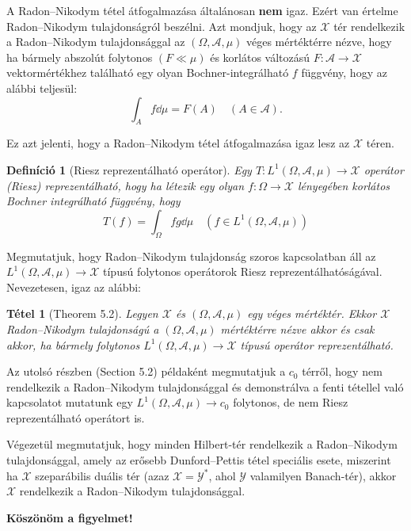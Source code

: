 \documentclass[handout]{beamer} %
\newtheorem{theo}[lem]{Tétel}
\newtheorem{defi}[lem]{Definíció}
\begin{document}
\begin{frame}
\justifying
A Radon\---Nikodym tétel átfogalmazása általánosan \textbf{nem} igaz. Ezért van értelme Radon\---Nikodym tulajdonságról beszélni. Azt mondjuk, hogy az $\mathcal{X}$ tér rendelkezik a Radon\---Nikodym tulajdonsággal az $(\Omega,\mathcal{A},\mu)$ véges mértéktérre nézve, hogy ha bármely abszolút folytonos $(F \ll \mu)$ és korlátos változású $F\colon \mathcal{A} \to \mathcal{X}$ vektormértékhez található egy olyan Bochner-integrálható $f$ függvény, hogy az alábbi teljesül:
$$\int_{A} f \dd{\mu} = F(A) \quad (A \in \mathcal{A}).$$

Ez azt jelenti, hogy a Radon\---Nikodym tétel átfogalmazása igaz lesz az $\mathcal{X}$ téren.
\begin{defi}[Riesz reprezentálható operátor] Egy $T \colon L^1(\Omega, \mathcal{A}, \mu) \to \mathcal{X}$ operátor (Riesz) reprezentálható, hogy ha létezik egy olyan $f\colon \Omega \to \mathcal{X}$ lényegében korlátos Bochner integrálható függvény, hogy
$$T(f) = \int_{\Omega} fg \dd{\mu} \quad(f \in L^1(\Omega, \mathcal{A}, \mu))$$
\end{defi}
\end{frame}
\begin{frame}
\justifying
Megmutatjuk, hogy Radon\---Nikodym tulajdonság szoros kapcsolatban áll az $L^1(\Omega, \mathcal{A}, \mu) \to \mathcal{X}$ típusú folytonos operátorok Riesz reprezentálhatóságával. Nevezetesen, igaz az alábbi:
\begin{theo}[Theorem 5.2] Legyen $\mathcal{X}$ és $(\Omega, \mathcal{A}, \mu)$ egy véges mértéktér. Ekkor $\mathcal{X}$ Radon\---Nikodym tulajdonságú a $(\Omega, \mathcal{A}, \mu)$ mértéktérre nézve akkor és csak akkor, ha bármely folytonos $L^1(\Omega, \mathcal{A}, \mu) \to \mathcal{X}$ típusú operátor reprezentálható.
\end{theo}
Az utolsó részben (Section 5.2) példaként megmutatjuk a $c_0$ térről, hogy nem rendelkezik a Radon\---Nikodym tulajdonsággal és demonstrálva a fenti tétellel való kapcsolatot mutatunk egy $L^1(\Omega, \mathcal{A}, \mu) \to c_0$ folytonos, de nem Riesz reprezentálható operátort is.

Végezetül megmutatjuk, hogy minden Hilbert-tér rendelkezik a Radon\---Nikodym tulajdonsággal, amely az erősebb Dunford\---Pettis tétel speciális esete, miszerint ha $\mathcal{X}$ szeparábilis duális tér (azaz $\mathcal{X} = \mathcal{Y}^*$, ahol $\mathcal{Y}$ valamilyen Banach-tér), akkor $\mathcal{X}$ rendelkezik a Radon\---Nikodym tulajdonsággal.
\end{frame}
\begin{frame}
\center
\textbf{Köszönöm a figyelmet!}
\end{frame}
\end{document}
